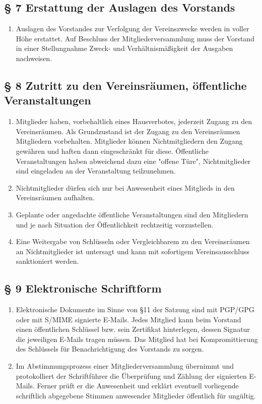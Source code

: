 \documentclass[10pt,a4paper]{article}
\begin{document}
\subsection*{§ 7 Erstattung der Auslagen des Vorstands}
\begin{enumerate}
\item Auslagen des Vorstandes zur Verfolgung der Vereinszwecke werden
	in voller Höhe erstattet. Auf Beschluss der Mitgliederversammlung
	muss der Vorstand in einer Stellungnahme Zweck- und Verhältnis\-mäßigkeit
	der Ausgaben nachweisen.
\end{enumerate}

\subsection*{§ 8 Zutritt zu den Vereinsräumen, öffentliche Veranstaltungen}
\begin{enumerate}
\item Mitglieder haben, vorbehaltlich eines Hausverbotes, jederzeit Zugang zu 
	den Vereinsräumen. Als Grundzustand ist der Zugang zu den Vereinsräumen
	Mitgliedern vorbehalten. Mitglieder können Nichtmitgliedern den Zugang
	gewähren und haften dann eingeschränkt für diese.
	Öffentliche Veranstaltungen haben abweichend dazu eine "offene Türe",
	Nichtmitglieder sind eingeladen an der Veranstaltung teilzunehmen.
\item Nichtmitglieder dürfen sich nur bei Anwesenheit eines Mitglieds in den
	Vereinsräumen aufhalten.
\item Geplante oder angedachte öffentliche Veranstaltungen sind den Mitgliedern und
	je nach Situation der Öffentlichkeit rechtzeitig vorzustellen.
\item Eine Weitergabe von Schlüsseln oder Vergleichbarem zu den Vereinsräumen an 
	Nichtmitglieder ist untersagt und kann mit sofortigem Vereinsausschluss 
	sanktioniert werden.
\end{enumerate}

\subsection*{§ 9 Elektronische Schriftform}
\begin{enumerate}
\item Elektronische Dokumente im Sinne von §11 der Satzung sind mit PGP/GPG
	oder mit S/MIME signierte E-Mails. Jedes Mitglied kann beim Vorstand
	einen öffentlichen Schlüssel bzw. sein Zertifikat hinterlegen, dessen
	Signatur die jeweiligen E-Mails tragen müssen. Das Mitglied hat bei
	Kompromittierung des Schlüssels für Benachrichtigung des Vorstands
	zu sorgen.
\item Im Abstimmungsprozess einer Mitgliederversammlung
	übernimmt und protokolliert der Schriftführer die Überprüfung und
	Zählung der signierten E-Mails. Ferner prüft er die Anwesenheit und
	erklärt eventuell vorliegende schriftlich abgegebene Stimmen anwesender
	Mitglieder öffentlich für ungültig.
\end{enumerate}
\end{document}
